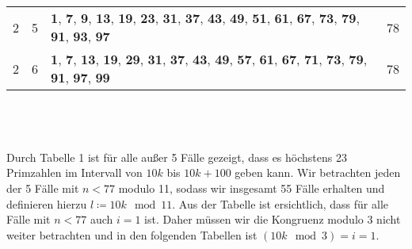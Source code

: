 \documentclass{article}
\begin{document}
\begin{tabular}{||c|c|l|c||}
	2&5&\textbf{1}, \textbf{7}, \textbf{9}, \textbf{13}, \textbf{19}, \textbf{23}, \textbf{31}, \textbf{37}, \textbf{43}, \textbf{49}, \textbf{51}, \textbf{61}, \textbf{67}, \textbf{73}, \textbf{79}, \textbf{91}, \textbf{93}, \textbf{97}&78\\
	2&6&\textbf{1}, \textbf{7}, \textbf{13}, \textbf{19}, \textbf{29}, \textbf{31}, \textbf{37}, \textbf{43}, \textbf{49}, \textbf{57}, \textbf{61}, \textbf{67}, \textbf{71}, \textbf{73}, \textbf{79}, \textbf{91}, \textbf{97}, \textbf{99}&78\\
\end{tabular}\\\ \\\ \\
    Durch Tabelle 1 ist für alle außer 5 Fälle gezeigt, dass es höchstens 23 Primzahlen im Intervall von $10k$ bis $10k+100$ geben kann. 
    Wir betrachten jeden der 5 Fälle mit $n<77$ modulo 11, sodass wir insgesamt 55 Fälle erhalten und definieren hierzu $l \coloneqq 10k \mod 11$. Aus der Tabelle ist ersichtlich, dass für alle Fälle mit $n<77$ auch $i=1$ ist.
    Daher müssen wir die Kongruenz modulo $3$ nicht weiter betrachten und in den folgenden Tabellen ist $(10k \mod 3) = i = 1$.\\
\end{document}
